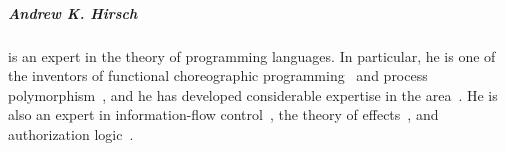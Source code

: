 \subparagraph{Andrew K. Hirsch} is an expert in the theory of programming languages.
In particular, he is one of the inventors of functional choreographic programming~\cite{HirschG22} and process polymorphism~\cite{GraversenHM24}, and he has developed considerable expertise in the area~\cite{SamuelsonHC25,GraversenHM24,HirschG22,BohosianH25}.
He is also an expert in information-flow control~\cite{SilverHCHZ23,MenzHLG23,HirschC21,HirschACAT20}, the theory of effects~\cite{SilverHCHZ23,HirschC21,HirschT18}, and authorization logic~\cite{HirschACAT20,HirschC13}.

